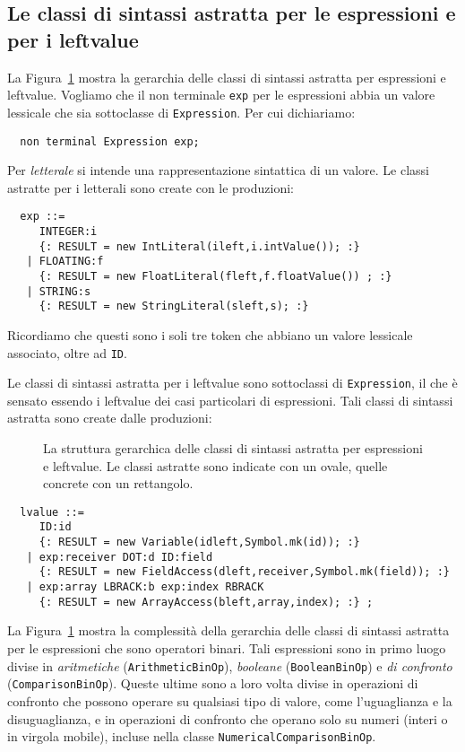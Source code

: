 \subsection{Le classi di sintassi astratta per le espressioni e per
            i leftvalue}
  \label{subsec:expressions_abstract}
%
La Figura~\ref{fig:expressions_hierarchy} mostra la gerarchia delle classi
di sintassi astratta per espressioni e leftvalue.
Vogliamo che il non terminale \texttt{exp} per le espressioni abbia
un valore lessicale che sia sottoclasse di \texttt{Expression}. Per
cui dichiariamo:
%
\begin{verbatim}
  non terminal Expression exp;
\end{verbatim}

Per \emph{letterale} si intende una rappresentazione sintattica di un
valore. Le classi astratte per i letterali sono create con le produzioni:
%
\begin{verbatim}
  exp ::=
     INTEGER:i
     {: RESULT = new IntLiteral(ileft,i.intValue()); :}
   | FLOATING:f
     {: RESULT = new FloatLiteral(fleft,f.floatValue()) ; :}
   | STRING:s
     {: RESULT = new StringLiteral(sleft,s); :}
\end{verbatim}
%
Ricordiamo che questi sono i soli tre token che abbiano un valore
lessicale associato, oltre ad \texttt{ID}.

Le classi di sintassi astratta per i leftvalue sono sottoclassi di
\texttt{Expression}, il che \`e sensato essendo i leftvalue dei casi
particolari di espressioni. Tali classi di sintassi astratta
sono create dalle produzioni:
%
\begin{figure}[t]
\begin{center}
\end{center}
\caption{La struttura gerarchica delle classi di sintassi astratta per
         espressioni e leftvalue. Le classi astratte sono indicate con un
         ovale, quelle concrete con un rettangolo.}
  \label{fig:expressions_hierarchy}
\end{figure}
%
\begin{verbatim}
  lvalue ::=
     ID:id
     {: RESULT = new Variable(idleft,Symbol.mk(id)); :}
   | exp:receiver DOT:d ID:field
     {: RESULT = new FieldAccess(dleft,receiver,Symbol.mk(field)); :}
   | exp:array LBRACK:b exp:index RBRACK
     {: RESULT = new ArrayAccess(bleft,array,index); :} ;
\end{verbatim}

La Figura~\ref{fig:expressions_hierarchy} mostra la complessit\`a della
gerarchia delle classi di sintassi astratta per le
espressioni che sono operatori binari. Tali espressioni
sono in primo luogo divise
in \emph{aritmetiche} (\texttt{ArithmeticBinOp}),
\emph{booleane} (\texttt{BooleanBinOp}) e
\emph{di confronto} (\texttt{ComparisonBinOp}).
Queste ultime sono a loro volta divise in operazioni di confronto
che possono operare su qualsiasi tipo di valore, come
l'uguaglianza e la disuguaglianza, e in operazioni di confronto
che operano solo su numeri (interi o in virgola mobile),
incluse nella classe \texttt{NumericalComparisonBinOp}.
%
